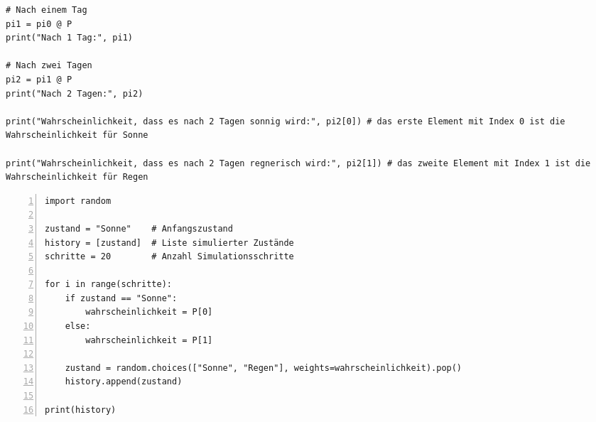 \begin{landscape}
\begin{multicols*}{3}
\begin{cheatSheetBox}[title=Python: Vorhersage von Zuständen]
\begin{lstlisting}
# Nach einem Tag
pi1 = pi0 @ P
print("Nach 1 Tag:", pi1)

# Nach zwei Tagen
pi2 = pi1 @ P
print("Nach 2 Tagen:", pi2)

print("Wahrscheinlichkeit, dass es nach 2 Tagen sonnig wird:", pi2[0]) # das erste Element mit Index 0 ist die Wahrscheinlichkeit für Sonne

print("Wahrscheinlichkeit, dass es nach 2 Tagen regnerisch wird:", pi2[1]) # das zweite Element mit Index 1 ist die Wahrscheinlichkeit für Regen
\end{lstlisting}
		\end{cheatSheetBox}
		\begin{cheatSheetBox}[title=Python: Vorhersage mit Zufallsimulation]
			\begin{lstlisting}[numbers=left]
import random

zustand = "Sonne"    # Anfangszustand
history = [zustand]  # Liste simulierter Zustände
schritte = 20        # Anzahl Simulationsschritte

for i in range(schritte):
    if zustand == "Sonne":
        wahrscheinlichkeit = P[0]
    else:
        wahrscheinlichkeit = P[1]

    zustand = random.choices(["Sonne", "Regen"], weights=wahrscheinlichkeit).pop()
    history.append(zustand)

print(history)
\end{lstlisting}
		\end{cheatSheetBox}
	\end{multicols*}
\end{landscape}

